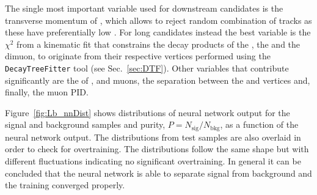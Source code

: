 The single most important variable used for downstream candidates is the transverse momentum of
\Lz, which allows to reject random combination of tracks as these have preferentially low \pt.
For long candidates instead the best variable is the $\chi^2$ from a kinematic fit that constrains
the decay products of the \Lb, the \Lz and the dimuon, to originate from their respective vertices
performed using the \verb!DecayTreeFitter! tool (see Sec.~\ref{sec:DTF}).
Other variables that contribute significantly are the \chisqip of \Lb, \Lz and muons,
the separation between the \Lb and \Lz vertices and, finally, the muon PID.

Figure~\ref{fig:Lb_nnDist} shows distributions of neural network output for the signal and background samples
and purity, $P=N_{\mathrm{sig}}/N_{\mathrm{bkg}}$, as a function of the neural network output.
The distributions from test samples are also overlaid in order to check for overtraining. 
The distributions follow the same shape but with different fluctuations
indicating no significant overtraining. In general it can be concluded that the neural network
is able to separate signal from background and the training converged properly.
%
